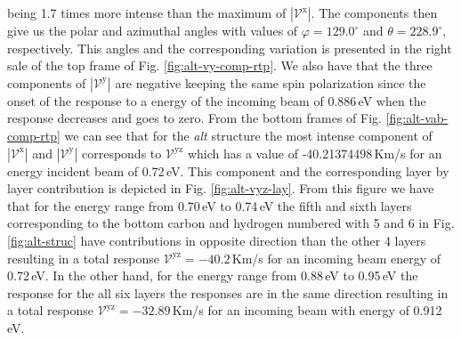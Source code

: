 \documentclass[prb,11pt,tightenlines,twocolumn,aps]{revtex4-1}
\begin{document}
being 1.7 times more intense than the maximum of $|\mathcal{V}^{\mathrm{x}}|$.
The components then give us the polar and azimuthal angles with values of
$\varphi=129.0^{\circ}$ and $\theta=228.9^{\circ}$, respectively. This angles
and the corresponding variation is presented in the right sale of the top frame
of Fig. \ref{fig:alt-vy-comp-rtp}.
% 
We also have that the three components of $|\mathcal{V}^{\mathrm{y}}|$ are
negative keeping the same spin polarization since the onset of the response to a
energy of the incoming beam of 0.886\,eV when the response decreases and goes to
zero.
From the bottom frames of Fig. \ref{fig:alt-vab-comp-rtp} we can see that for
the \emph{alt} structure the most intense component of
$|\mathcal{V}^{\mathrm{x}}|$ and $|\mathcal{V}^{\mathrm{y}}|$ corresponds to
$\mathcal{V}^{\mathrm{yz}}$ which has a value of -40.21374498\,Km/s for an
energy incident beam of 0.72\,eV. This component and the corresponding layer by
layer contribution is depicted in Fig. \ref{fig:alt-vyz-lay}. From this figure
we have that for the energy range from 0.70\,eV to 0.74\,eV the fifth and sixth
layers corresponding to the bottom carbon and hydrogen numbered with 5 and 6 in
Fig. \ref{fig:alt-struc} have contributions in opposite direction than the other
4 layers resulting in a total response $\mathcal{V}^{\mathrm{yz}}= -40.2$\,Km/s
for an incoming beam energy of 0.72\,eV. In the other hand, for the energy range
from 0.88\,eV to 0.95\,eV the response for the all six layers the responses are
in the same direction resulting in a total response
$\mathcal{V}^{\mathrm{yz}}=-32.89$\,Km/s for an incoming beam with energy of
0.912\,eV.

\end{document}
